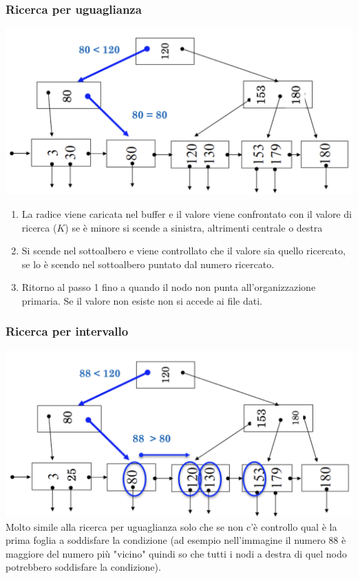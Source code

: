 \documentclass[12pt, a4paper]{report}
\begin{document}
    \subsubsection{Ricerca per uguaglianza}
    \includegraphics[width=\textwidth]{Appunti Latex/Immagini/ricercaindici.png}
    \begin{enumerate}
        \item La radice viene caricata nel buffer e il valore viene confrontato con il valore di ricerca ($K$) se è minore si scende a sinistra, altrimenti centrale o destra
        \item Si scende nel sottoalbero e viene controllato che il valore sia quello ricercato, se lo è scendo nel sottoalbero puntato dal numero ricercato.
        \item Ritorno al passo 1 fino a quando il nodo non punta all'organizzazione primaria. Se il valore non esiste non si accede ai file dati.
    \end{enumerate}
    \subsubsection{Ricerca per intervallo}
    \includegraphics[width=\textwidth]{Appunti Latex/Immagini/ricercaindiciintervallo.png}
Molto simile alla ricerca per uguaglianza solo che se non c'è controllo qual è la prima foglia a soddisfare la condizione (ad esempio nell'immagine il numero 88 è maggiore del numero più "vicino" quindi so che tutti i nodi a destra di quel nodo potrebbero soddisfare la condizione).
\end{document}
